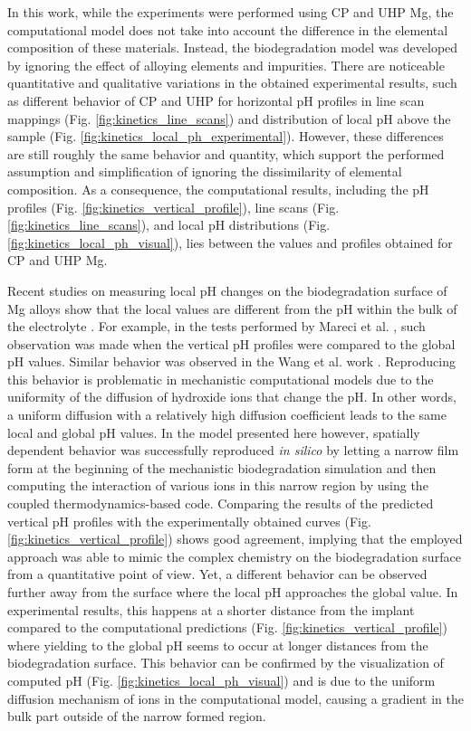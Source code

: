 In this work, while the experiments were performed using {CP} and {UHP} Mg, the computational model does not take into account the difference in the elemental composition of these materials. Instead, the biodegradation model was developed by ignoring the effect of alloying elements and impurities. There are noticeable quantitative and qualitative variations in the obtained experimental results, such as different behavior of {CP} and {UHP} for horizontal pH profiles in line scan mappings (Fig. \ref{fig:kinetics_line_scans}) and distribution of local pH above the sample (Fig. \ref{fig:kinetics_local_ph_experimental}). However, these differences are still roughly the same behavior and quantity, which support the performed assumption and simplification of ignoring the dissimilarity of elemental composition. As a consequence, the computational results, including the pH profiles (Fig. \ref{fig:kinetics_vertical_profile}), line scans (Fig. \ref{fig:kinetics_line_scans}), and local pH distributions (Fig. \ref{fig:kinetics_local_ph_visual}), lies between the values and profiles obtained for {CP} and {UHP} Mg.

Recent studies on measuring local pH changes on the biodegradation surface of Mg alloys show that the local values are different from the pH within the bulk of the electrolyte \cite{Gonzalez2021}. For example, in the tests performed by Mareci et al. \cite{Mareci2016}, such observation was made when the vertical pH profiles were compared to the global pH values. Similar behavior was observed in the Wang et al. work \cite{Wang2022}. Reproducing this behavior is problematic in mechanistic computational models due to the uniformity of the diffusion of hydroxide ions that change the pH. In other words, a uniform diffusion with a relatively high diffusion coefficient leads to the same local and global pH values. In the model presented here however, spatially dependent  behavior was successfully reproduced \textit{in silico} by letting a narrow film form at the beginning of the mechanistic biodegradation simulation and then computing the interaction of various ions in this narrow region by using the coupled thermodynamics-based code. Comparing the results of the predicted vertical pH profiles with the experimentally obtained curves (Fig. \ref{fig:kinetics_vertical_profile}) shows good agreement, implying that the employed approach was able to mimic the complex chemistry on the biodegradation surface from a quantitative point of view. Yet, a different behavior can be observed further away from the surface where the local pH approaches the global value. In experimental results, this happens at a shorter distance from the implant compared to the computational predictions (Fig. \ref{fig:kinetics_vertical_profile}) where yielding to the global pH seems to occur at longer distances from the biodegradation surface. This behavior can be confirmed by the visualization of computed pH (Fig. \ref{fig:kinetics_local_ph_visual}) and is due to the uniform diffusion mechanism of ions in the computational model, causing a gradient in the bulk part outside of the narrow formed region.

